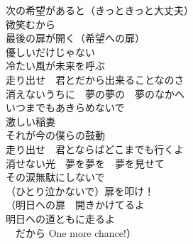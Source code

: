 {次の希望があると（きっときっと大丈夫）\\微笑むから\\
最後の扉が開く（希望への扉）\\

優しいだけじゃない\\
冷たい風が未来を呼ぶ\\
走り出せ　君とだから出来ることなのさ\\
消えないうちに　夢の夢の　夢のなかへ\\
いつまでもあきらめないで\\

激しい稲妻\\
それが今の僕らの鼓動\\
走り出せ　君とならばどこまでも行くよ\\
消せない光　夢を夢を　夢を見せて\\
その涙無駄にしないで\\
（ひとり泣かないで）扉を叩け！\\

（明日への扉　開きかけてるよ\\
明日への道ともに走るよ\\　だから One more chance!）
}


